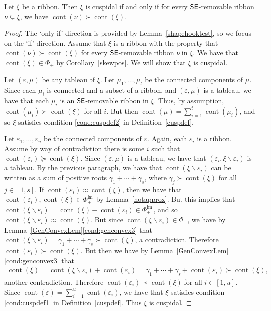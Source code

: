 \documentclass[Unicode,ALCO]{cedram}
\newcommand{\im}{\operatorname{im}}
\newcommand{\0}{{\bar 0}}
\newcommand{\ssee}{{\sf SE}}
\def\cont{{\operatorname{cont}}}
\def\im{{\mathrm{im}\,}}
\begin{document}
 \begin{lemma}\label{CuspForSkewHook}
Let \(\xi\) be a ribbon. Then \(\xi\) is cuspidal if and only if for every \(\ssee\)-removable ribbon \(\nu \subsetneq \xi\), we have \(\cont(\nu) \succ \cont(\xi)\).
 \end{lemma}
 \begin{proof}
The `only if' direction is provided by Lemma~\ref{shapehooktest}, so we focus on the `if' direction. 
 Assume that \(\xi\) is a ribbon with
 the property that \(\cont(\nu) \succ \cont(\xi)\) for every \(\ssee\)-removable ribbon \(\nu\) in \( \xi\). We have that \(\cont(\xi) \in \Phi_+\) by Corollary~\ref{skewpos}. We will show that \(\xi\) is cuspidal. 
 
 
 Let \((\varepsilon, \mu)\) be any tableau of \(\xi\). Let \(\mu_1, \ldots, \mu_t\) be the connected components of \(\mu\). Since each \(\mu_i\) is connected and a subset of a ribbon, and \((\varepsilon, \mu)\) is a tableau, we have that each \(\mu_i\) is an \(\ssee\)-removable ribbon in \(\xi\). Thus, by assumption, \(\cont(\mu_i) \succ \cont(\xi)\) for all \(i\). But then \(\cont(\mu) = \sum_{i=1}^t \cont(\mu_i)\), and so \(\xi\) satisfies condition \eqref{cond:cuspdef2} in Definition~\ref{cuspdef}.
 
 Let \(\varepsilon_1, \ldots, \varepsilon_u\) be the connected components of \(\varepsilon\). Again, each \(\varepsilon_i\) is a ribbon. Assume by way of contradiction there is some \(i\) such that \(\cont(\varepsilon_i) \succeq \cont(\xi)\). Since \((\varepsilon, \mu)\) is a tableau, we have that \((\varepsilon_i, \xi\backslash \varepsilon_i)\) is a tableau. By the previous paragraph, we have that \(\cont(\xi \backslash \varepsilon_i)\) can be written as a sum of positive roots \(\gamma_1 + \cdots + \gamma_s\), where \(\gamma_j \succ \cont(\xi)\) for all \(j \in [1,s]\). 
 If \(\cont(\varepsilon_i) \approx \cont(\xi)\), then we have that \(\cont(\varepsilon_i),\cont(\xi) \in \Phi_+^\im\) by Lemma~\ref{notapprox}. But this implies that \(\cont(\xi \backslash \varepsilon_i) = \cont(\xi) - \cont(\varepsilon_i) \in \Phi_+^\im\), and so \(\cont(\xi\backslash \varepsilon_i) \approx \cont(\xi)\). But since \(\cont(\xi \backslash \varepsilon_i) \in \Phi_+\), we have by Lemma~\ref{GenConvexLem}\eqref{cond:genconvex3} that \(\cont(\xi \backslash \varepsilon_i) =  \gamma_1 + \cdots + \gamma_s \succ \cont(\xi)\), a contradiction. Therefore \(\cont(\varepsilon_i) \succ \cont(\xi)\). But then we have by Lemma~\ref{GenConvexLem}\eqref{cond:genconvex3} that 
 \begin{align*}
 \cont(\xi) = \cont(\xi \backslash \varepsilon_i) + \cont(\varepsilon_i) = \gamma_1 + \cdots + \gamma_s + \cont(\varepsilon_i) \succ \cont(\xi),
 \end{align*}
 another contradiction. Therefore \(\cont(\varepsilon_i) \prec \cont(\xi)\) for all \(i \in [1,u]\). Since \(\cont(\varepsilon) = \sum_{i=1}^u \cont(\varepsilon_i)\), we have that \(\xi\) satisfies condition \eqref{cond:cuspdef1} in Definition~\ref{cuspdef}. Thus \(\xi\) is cuspidal.
 \end{proof}
\end{document}
